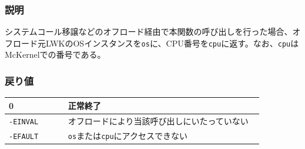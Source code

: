 \documentclass[twoside,11pt,fleqn]{book}
\begin{document}
\subsubsection*{説明}{\quad}
システムコール移譲などのオフロード経由で本関数の呼び出しを行った場合、オフロード元LWKのOSインスタンスを\texttt{os}に、CPU番号を\texttt{cpu}に返す。なお、\texttt{cpu}はMcKernelでの番号である。

\subsubsection*{戻り値}
\begin{table}[!h]
\footnotesize
\begin{tabular}{|p{0.20\linewidth}|p{0.66\linewidth}|} \hline
0&正常終了\\ \hline
\texttt{-EINVAL}&オフロードにより当該呼び出しにいたっていない\\ \hline
\texttt{-EFAULT}&\texttt{os}または\texttt{cpu}にアクセスできない\\ \hline
\end{tabular}
\vspace{-0em}
\end{table}
\FloatBarrier

\section{}\label{sec:ihk_commands}
\end{document}
